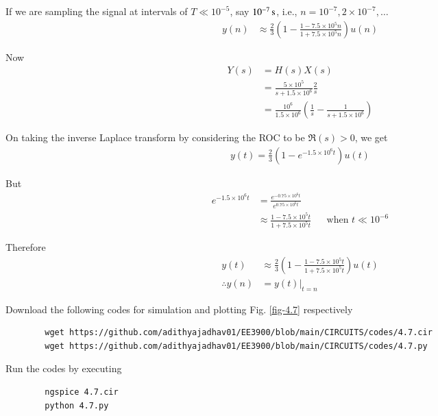 \documentclass[journal,12pt,twocolumn]{IEEEtran}
\providecommand{\brak}[1]{\ensuremath{\left(#1\right)}}
\numberwithin{equation}{section}
\numberwithin{figure}{section}
\renewcommand\thesection{\arabic{section}}
\begin{document}
\begin{enumerate}[label=\thesection.\arabic*.,ref=\thesection.\theenumi]
	If we are sampling the signal at intervals of $T \ll 10^{-5}$, say $\SI[parse-numbers=false]{10^{-7}}{\second}$, i.e., $n = 10^{-7}, 2\times10^{-7},\ldots$
	\begin{align}
		y(n) &\approx \frac{2}{3} \brak{1 - \frac{1-7.5\times10^5n}{1+7.5\times10^5n}}u(n)
	\end{align}
	
	Now
	\begin{align}
		Y(s) &= H(s)X(s) \\
		&= \frac{5\times10^5}{s+1.5\times10^6} \frac{2}{s} \\
		&= \frac{10^6}{1.5\times10^6} \brak{\frac{1}{s} - \frac{1}{s+1.5\times10^6}}
	\end{align}
	
	On taking the inverse Laplace transform by considering the ROC to be $\Re(s) > 0$, we get
	\begin{align}
		y(t) = \frac{2}{3}\brak{1 - e^{-1.5\times10^6t}}u(t)
	\end{align}
	
	But 
	\begin{align}
		e^{-1.5\times 10^6 t} &= \frac{e^{-0.75 \times 10^6 t}}{e^{0.75 \times 10^6 t}} \\
		&\approx \frac{1-7.5\times10^5t}{1+7.5\times10^5t} && \text{when } t \ll 10^{-6} 
	\end{align}
	
	Therefore
	\begin{align}
		y(t) &\approx \frac{2}{3} \brak{1 - \frac{1-7.5\times10^5t}{1+7.5\times10^5t}} u(t) \\
		\therefore y(n) &= y(t)|_{t=n}
	\end{align}
	
	Download the following codes for simulation and plotting Fig. \ref{fig-4.7} respectively
	\begin{lstlisting}
		wget https://github.com/adithyajadhav01/EE3900/blob/main/CIRCUITS/codes/4.7.cir
		wget https://github.com/adithyajadhav01/EE3900/blob/main/CIRCUITS/codes/4.7.py
	\end{lstlisting}
	
	Run the codes by executing
	\begin{lstlisting}
		ngspice 4.7.cir
		python 4.7.py
	\end{lstlisting}	
	

\end{enumerate}
\end{document}
